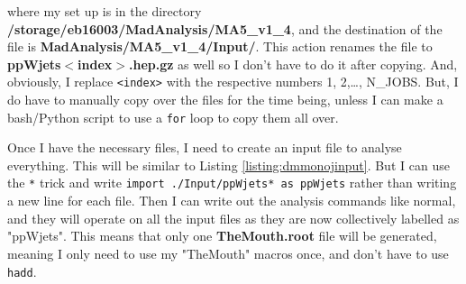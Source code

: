 where my \madanalysis set up is in the directory \textbf{/storage/eb16003/MadAnalysis/MA5\_v1\_4}, and the destination of the file is \textbf{MadAnalysis/MA5\_v1\_4/Input/}. This action renames the file to \textbf{ppWjets$<$index$>$.hep.gz} as well so I don't have to do it after copying. And, obviously, I replace \verb!<index>! with the respective numbers 1, 2,\ldots, N\_JOBS. But, I do have to manually copy over the files for the time being, unless I can make a bash/Python script to use a \verb!for! loop to copy them all over. 


Once I have the necessary files, I need to create an input file to analyse everything. This will be similar to Listing \ref{listing:dmmonojinput}. But I can use the \verb!*! trick and write \verb!import ./Input/ppWjets* as ppWjets! rather than writing a new line for each file. Then I can write out the analysis commands like normal, and they will operate on all the input files as they are now collectively labelled as "ppWjets". This means that only one \textbf{TheMouth.root} file will be generated, meaning I only need to use my "TheMouth" macros once, and don't have to use \verb!hadd!.

